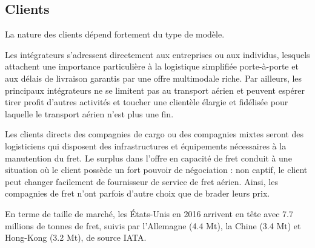 \subsection{Clients}

La nature des clients dépend fortement du type de modèle.

Les intégrateurs s'adressent directement aux entreprises ou aux individus, lesquels attachent une importance particulière à la logistique simplifiée porte-à-porte et aux délais de livraison garantis par une offre multimodale riche. Par ailleurs, les principaux intégrateurs ne se limitent pas au transport aérien et peuvent espérer tirer profit d'autres activités et toucher une clientèle élargie et fidélisée pour laquelle le transport aérien n'est plus une fin.

Les clients directs des compagnies de cargo ou des compagnies mixtes seront des logisticiens qui disposent des infrastructures et équipements nécessaires à la manutention du fret. Le surplus dans l'offre en capacité de fret conduit à une situation où le client
possède un fort pouvoir de négociation : non captif, le client peut changer facilement de fournisseur de service de fret aérien. Ainsi, les compagnies de fret n'ont parfois d'autre choix que de brader leurs prix.

En terme de taille de marché, les États-Unis en 2016 arrivent en tête avec 7.7 millions de tonnes de fret, suivis par l'Allemagne (4.4 Mt), la Chine (3.4 Mt) et Hong-Kong (3.2 Mt), de source IATA.

